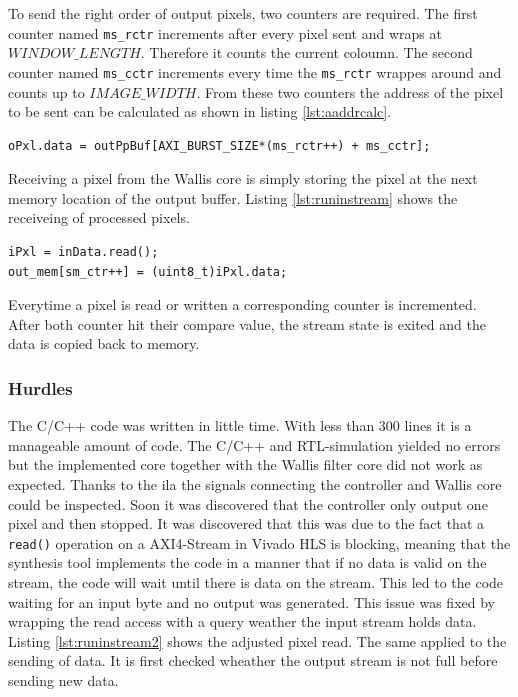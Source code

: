 To send the right order of output pixels, two counters are required. The first
counter named \texttt{ms\_rctr} increments after every pixel sent and wraps at
$WINDOW\_LENGTH$. Therefore it counts the current coloumn. The second counter
named \texttt{ms\_cctr} increments every time the \texttt{ms\_rctr} wrappes
around and counts up to $IMAGE\_WIDTH$. From these two counters the address of
the pixel to be sent can be calculated as shown in listing \ref{lst:aaddrcalc}.

\begin{minipage}{\textwidth}
\begin{lstlisting}[style=CStyle, caption=Pixel send address calculation,
label=lst:aaddrcalc]
oPxl.data = outPpBuf[AXI_BURST_SIZE*(ms_rctr++) + ms_cctr];\end{lstlisting}
\end{minipage}

Receiving a pixel from the Wallis core is simply storing the pixel at the next
memory location of the
output buffer. Listing \ref{lst:runinstream} shows the receiveing of processed
pixels.

\begin{minipage}{\textwidth}
\begin{lstlisting}[style=CStyle, caption=Pixel read store,
label=lst:runinstream]
iPxl = inData.read();
out_mem[sm_ctr++] = (uint8_t)iPxl.data;\end{lstlisting}
\end{minipage}

Everytime a pixel is read or written a corresponding counter is incremented.
After both counter hit their compare value, the stream state is exited and the
data is copied back to memory.

\subsubsection*{Hurdles}
The C/C++ code was written in little time. With less than 300 lines it
is a manageable amount of code.
The C/C++ and RTL-simulation yielded no errors but the
implemented core together with the Wallis filter core did not work as expected.
Thanks to the \gls{ila} the signals connecting the controller
and Wallis core could be inspected. Soon it was discovered that the controller
only output one pixel and then stopped. It was discovered that this was due to
the fact that a \texttt{read()} operation on a AXI4-Stream in Vivado HLS is
blocking, meaning that the synthesis tool implements the code in a  manner that
if no data is
valid on the stream, the code will wait until there is data on the stream. This
led to the code waiting for an input byte and no output was generated. This
issue was fixed by wrapping the read access with a query weather the input
stream holds data. Listing \ref{lst:runinstream2} shows the adjusted pixel read.
The same applied to the sending of data. It is first checked wheather the output
stream is not full before sending new data.

